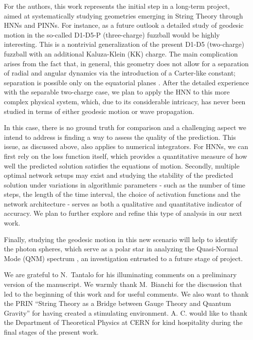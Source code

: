 \documentclass[prd,aps,a4paper,eqsecnum,nofootinbib,floatfix,twocolumn,superscriptaddress]{revtex4-2}
\renewcommand{\quote}[1]{``#1''}
\begin{document}
For the authors, this work represents the initial step in a long-term project, aimed at systematically studying geometries emerging in String Theory through HNNs and PINNs. For instance, as a future outlook a detailed study of geodesic motion in the so-called D1-D5-P (three-charge) fuzzball would be highly interesting. This is a nontrivial generalization of the present D1-D5 (two-charge) fuzzball with an additional Kaluza-Klein (KK) charge. The main complication arises from the fact that, in general, this geometry does not allow for a separation of radial and angular dynamics via the introduction of a Carter-like constant; separation is possible only on the equatorial planes \cite{Bianchi:2018kzy}. After the detailed experience with the separable two-charge case, we plan to apply the HNN to this more complex physical system, which, due to its considerable intricacy, has never been studied in terms of either geodesic motion or wave propagation.
 
In this case, there is no ground truth for comparison and a challenging aspect we intend to address is finding a way to assess the quality of the prediction. This issue, as discussed above, also applies to numerical integrators. For HNNs, we can first rely on the loss function itself, which provides a quantitative measure of how well the predicted solution satisfies the equations of motion. Secondly, multiple optimal network setups may exist and studying the stability of the predicted solution under variations in algorithmic parameters - such as the number of time steps, the length of the time interval, the choice of activation functions and the network architecture - serves as both a qualitative and quantitative indicator of accuracy. We plan to further explore and refine this type of analysis in our next work.

 Finally, studying the geodesic motion in this new scenario will help to identify the photon spheres, which serve as a polar star in analyzing the Quasi-Normal Mode (QNM) spectrum \cite{Bianchi:2023rlt,Bianchi:2023sfs,Cipriani:2024ygw}, an investigation entrusted to a future stage of project.

\begin{acknowledgments}
We are grateful to N.~Tantalo for his illuminating comments on a preliminary version of the manuscript. We warmly thank M.~Bianchi for the discussion that led to the beginning of this work and for useful comments. We also want to thank the PRIN \quote{String Theory as a Bridge between Gauge Theory and Quantum Gravity} for having created a stimulating environment. A. C. would like to thank the Department of Theoretical Physics at CERN for kind hospitality during the final stages of the present work.

\end{acknowledgments}
\end{document}

